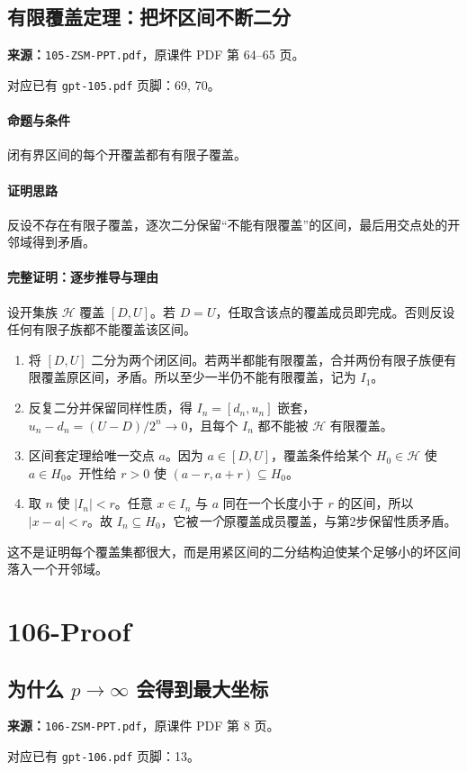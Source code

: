 \clearpage\subsection{有限覆盖定理：把坏区间不断二分}
\textbf{来源：}\texttt{105-ZSM-PPT.pdf}，原课件 PDF 第 64--65 页。\par
对应已有 \texttt{gpt-105.pdf} 页脚：69, 70。\par
\paragraph{命题与条件}闭有界区间的每个开覆盖都有有限子覆盖。
\paragraph{证明思路}反设不存在有限子覆盖，逐次二分保留“不能有限覆盖”的区间，最后用交点处的开邻域得到矛盾。
\paragraph{完整证明：逐步推导与理由}

设开集族 $\mathcal H$ 覆盖 $[D,U]$。若 $D=U$，任取含该点的覆盖成员即完成。否则反设任何有限子族都不能覆盖该区间。
\begin{enumerate}
\item 将 $[D,U]$ 二分为两个闭区间。若两半都能有限覆盖，合并两份有限子族便有限覆盖原区间，矛盾。所以至少一半仍不能有限覆盖，记为 $I_1$。
\item 反复二分并保留同样性质，得 $I_n=[d_n,u_n]$ 嵌套，$u_n-d_n=(U-D)/2^n\to0$，且每个 $I_n$ 都不能被 $\mathcal H$ 有限覆盖。
\item 区间套定理给唯一交点 $a$。因为 $a\in[D,U]$，覆盖条件给某个 $H_0\in\mathcal H$ 使 $a\in H_0$。开性给 $r>0$ 使 $(a-r,a+r)\subseteq H_0$。
\item 取 $n$ 使 $|I_n|<r$。任意 $x\in I_n$ 与 $a$ 同在一个长度小于 $r$ 的区间，所以 $|x-a|<r$。故 $I_n\subseteq H_0$，它被\emph{一个}原覆盖成员覆盖，与第2步保留性质矛盾。
\end{enumerate}
这不是证明每个覆盖集都很大，而是用紧区间的二分结构迫使某个足够小的坏区间落入一个开邻域。

\clearpage\section{106-Proof}
\clearpage\subsection{为什么 $p\to\infty$ 会得到最大坐标}
\textbf{来源：}\texttt{106-ZSM-PPT.pdf}，原课件 PDF 第 8 页。\par
对应已有 \texttt{gpt-106.pdf} 页脚：13。\par
